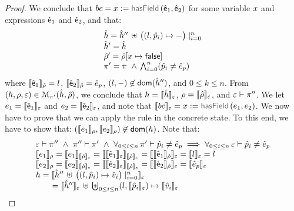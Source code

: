 \begin{proof}
\noindent{}
We conclude that  $\bcmd = \jvar := \hasfield(\pvsexpr_1, \pvsexpr_2)$ for some variable $\jvar$ and expressions $\pvsexpr_1$ and $\pvsexpr_2$, and that: 
$$
\begin{array}{l}
  \sheap =  \sheap'' \, \uplus \, \big((l, \sexprp_i) \mapsto -\big)\mid_{i = 0}^n      \\
  \sheap' =  \sheap \\
  \sstore' = \sstore[\jvar \mapsto \jfalse] \\ 
     \pc' = \pc \ \wedge \,  \bigwedge_{i = 0}^n (\sexprp_i \neq \sexpr_p) 
\end{array}
$$ 
where $\symbeval{\pvsexpr_1}{\sstore} =  \loc$, $\symbeval{\pvsexpr_2}{\sstore} =  \sexpr_p$, 
$(\loc, -) \not\in \domain(\sheap'')$, and $0 \leq k \leq n$. 
%
From $(\heap, \store, \senv) \in \smodels{\sheap, \sstore}{\pc'}$, we conclude that $\heap = \semexpr{\sheap}{\senv}$, $\store = \semexpr{\sstore}{\senv}$, and 
$\senv \vdash \pc''$. 
We let $\jsilexpr_1 = \symbeval{\pvsexpr_1}{\senv}$ and  
$\jsilexpr_2 = \symbeval{\pvsexpr_2}{\senv}$, and note that $\symbeval{\bcmd}{\senv} = \jvar := \hasfield(\jsilexpr_1, \jsilexpr_2)$.
We now have to prove that we can apply the  rule in the concrete state.
To this end, we have to show that: $(\symbeval{\jsilexpr_1}{\store}, \symbeval{\jsilexpr_2}{\store}) \not\in \domain(\heap)$. 
Note that: 
$$
\begin{array}{l}
%
\senv \vdash \pc'' \ \wedge \ \pc'' \vdash \pc' \ \wedge \ \forall_{0 \leq i \leq n}  \, \pc' \vdash \sexprp_i \neq \sexpr_p  
      \implies \forall_{0 \leq i \leq n}  \, \senv \vdash \sexprp_i \neq \sexpr_p  \\
%
 \symbeval{\jsilexpr_1}{\store} = \symbeval{\jsilexpr_1}{\symbeval{\sstore}{\senv}} = \symbeval{\symbeval{\pvsexpr_1}{\senv}}{\symbeval{\sstore}{\senv}} = \symbeval{\symbeval{\pvsexpr_1}{\sstore}}{\senv} 
    = \symbeval{\loc}{\senv} = \loc \\ 
  \symbeval{\jsilexpr_2}{\store}  = \symbeval{\jsilexpr_2}{\semexpr{\sstore}{\senv}} =  \symbeval{\symbeval{\pvsexpr_2}{\senv}}{\symbeval{\sstore}{\senv}} = \symbeval{\symbeval{\pvsexpr_2}{\sstore}}{\senv}
   =  \symbeval{\sexpr_p}{\senv} \\
 \heap = \semexpr{\sheap'' \, \uplus \, \big((l, \sexprp_i) \mapsto \sexprv_i\big)\mid_{i = 0}^n}{\senv} \\
    \qquad = \semexpr{\sheap''}{\senv} \dunion \biguplus_{0 \leq i \leq n} (l, \semexpr{\sexprp_i}{\senv}) \mapsto \semexpr{\sexprv_i}{\senv}

\end{array}$$
\end{proof}
